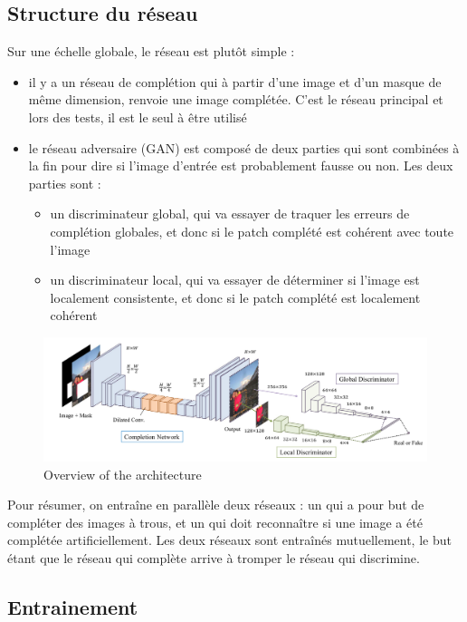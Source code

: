 \documentclass[12pt]{article}
\begin{document}
\subsection{Structure du réseau}
Sur une échelle globale, le réseau est plutôt simple : 
\begin{itemize}
    \item il y a un réseau de complétion qui à partir d'une image et d'un masque de même dimension, renvoie une image complétée. C'est le réseau principal et lors des tests, il est le seul à être utilisé
    \item le réseau adversaire (GAN) est composé de deux parties qui sont combinées à la fin pour dire si l'image d'entrée est probablement fausse ou non. Les deux parties sont : 
    \begin{itemize}
        \item un discriminateur global, qui va essayer de traquer les erreurs de complétion globales, et donc si le patch complété est cohérent avec toute l'image
        \item un discriminateur local, qui va essayer de déterminer si l'image est localement consistente, et donc si le patch complété est localement cohérent
    \end{itemize}
\end{itemize}

\begin{figure}[H]
    \includegraphics[width=1.0\textwidth]{Images/network_overview.png}
    \caption{Overview of the architecture}
\end{figure}

Pour résumer, on entraîne en parallèle deux réseaux : un qui a pour
but de compléter des images à trous, et un qui doit reconnaître si une
image a été complétée artificiellement. Les deux réseaux sont entraînés mutuellement, le but étant que le réseau qui complète arrive à tromper le réseau qui discrimine.

\subsection{Entrainement}
\end{document}
